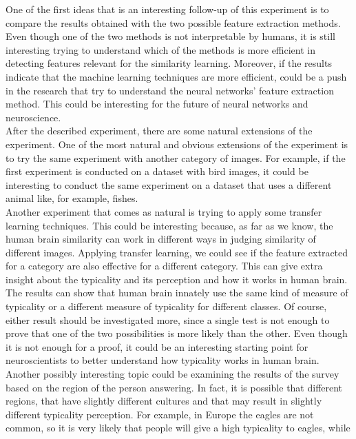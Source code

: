 \documentclass[conference]{IEEEtran}
\begin{document}
			\noindent One of the first ideas that is an interesting follow-up of this experiment is to compare the results obtained with the two possible feature extraction methods. Even though one of the two methods is not 
			interpretable by humans, it is still interesting trying to understand which of the methods is more efficient in detecting features relevant for the similarity learning. Moreover, if the results 
			indicate that the machine learning techniques are more efficient, could be a push in the research that try to understand the neural networks' feature extraction method. This could be interesting 
			for the future of neural networks and neuroscience. \\
			After the described experiment, there are some natural extensions of the experiment. One of the most natural and obvious extensions of the experiment is to try the same experiment with another category 
			of images. For example, if the first experiment is conducted on a dataset with bird images, it could be interesting to conduct the same experiment on a dataset that uses a different animal like, for 
			example, fishes.\\
			Another experiment that comes as natural is trying to apply some transfer learning techniques. This could be interesting because, as far as we know, the human brain similarity can work 
			in different ways in judging similarity of different images. Applying transfer learning, we could see if the feature extracted for a category are also effective for a different category. This can give 
			extra insight about the typicality and its perception and how it works in human brain. The results can show that human brain innately use the same kind of measure of typicality or a different measure of 
			typicality for different classes. Of course, either result should be investigated more, since a single test is not enough to prove that one of the two possibilities is more likely than the other. Even though 
			it is not enough for a proof, it could be an interesting starting point for neuroscientists to better understand how typicality works in human brain.\\
			Another possibly interesting topic could be examining the results of the survey based on the region of the person answering. In fact, it is possible that different regions, that have slightly different 
			cultures and that may result in slightly different typicality perception. For example, in Europe the eagles are not common, so it is very likely that people will give a high typicality to eagles, while 
\end{document}
